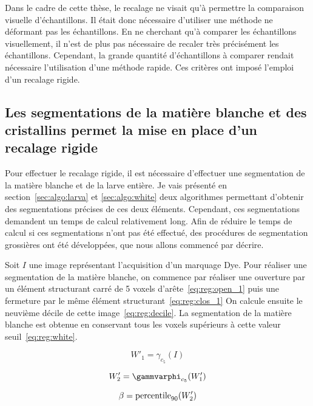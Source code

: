 \documentclass[\main/main.tex]{subfiles}
\begin{document}
%
Dans le cadre de cette thèse, le recalage ne visait qu'à permettre la comparaison visuelle d'échantillons.
%
Il était donc nécessaire d'utiliser une méthode ne déformant pas les échantillons.
%
En ne cherchant qu'à comparer les échantillons visuellement, il n'est de plus pas nécessaire de recaler très précisément les échantillons.
%
Cependant, la grande quantité d'échantillons à comparer rendait nécessaire l'utilisation d'une méthode rapide.
%
Ces critères ont imposé l'emploi d'un recalage rigide.

\subsection{Les segmentations de la matière blanche et des cristallins permet la mise en place d'un recalage rigide}

Pour effectuer le recalage rigide, il est nécessaire d'effectuer une segmentation de la matière blanche et de la larve entière.
%
Je vais présenté en section~\ref{sec:algo:larva} et \ref{sec:algo:white} deux algorithmes permettant d'obtenir des segmentations précises de ces deux éléments.
%
Cependant, ces segmentations demandent un temps de calcul relativement long.
%
Afin de réduire le temps de calcul si ces segmentations n'ont pas été effectué, des procédures de segmentation grossières ont été développées, que nous allons commencé par décrire.

%
Soit $I$ une image représentant l'acquisition d'un marquage Dye.
%
Pour réaliser une segmentation de la matière blanche, on commence par réaliser une ouverture par un élément structurant carré de 5 voxels d'arête~\eqref{eq:reg:open_1} puis une fermeture par le même élément structurant~\eqref{eq:reg:clos_1}
%
On calcule ensuite le neuvième décile de cette image~\eqref{eq:reg:decile}.
%
La segmentation de la matière blanche est obtenue en conservant tous les voxels supérieurs à cette valeur seuil~\eqref{eq:reg:white}.

\begin{equation}
    \label{eq:reg:open_1}
    W'_{1} = \gamma_{c_5}(I)
\end{equation}

\begin{equation}
    \label{eq:reg:clos_1}
    W'_{2} = \gammvarphi_{c_5}(W'_1)
\end{equation}

\begin{equation}
    \label{eq:reg:decile}
    \beta = \operatorname{\textnormal{percentile}}_{90}(W'_2)
\end{equation}
\end{document}
